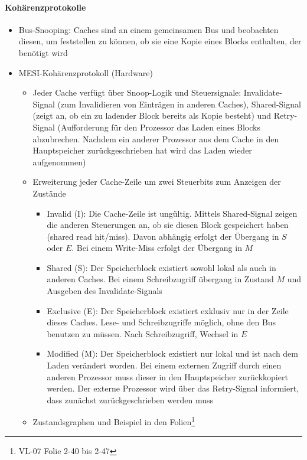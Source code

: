 	\paragraph{Kohärenzprotokolle}
		\begin{itemize}
			\item Bus-Snooping: Caches sind an einem gemeinsamen Bus und beobachten diesen, um feststellen zu können, ob sie eine Kopie eines Blocks enthalten, der benötigt wird
			\item MESI-Kohärenzprotokoll (Hardware)
			\begin{itemize}
				\item Jeder Cache verfügt über Snoop-Logik und Steuersignale: Invalidate-Signal (zum Invalidieren von Einträgen in anderen Caches), Shared-Signal (zeigt an, ob ein zu ladender Block bereits als Kopie besteht) und Retry-Signal (Aufforderung für den Prozessor das Laden eines Blocks abzubrechen. Nachdem ein anderer Prozessor aus dem Cache in den Hauptspeicher zurückgeschrieben hat wird das Laden wieder aufgenommen)
				\item Erweiterung jeder Cache-Zeile um zwei Steuerbits zum Anzeigen der Zustände
				\begin{itemize}
					\item Invalid (I): Die Cache-Zeile ist ungültig. Mittels Shared-Signal zeigen die anderen Steuerungen an, ob sie diesen Block gespeichert haben (shared read hit/miss). Davon abhängig erfolgt der Übergang in \(S\) oder \(E\). Bei einem Write-Miss erfolgt der Übergang in \(M\)
					\item Shared (S): Der Speicherblock existiert sowohl lokal als auch in anderen Caches. Bei einem Schreibzugriff übergang in Zustand \(M\) und Ausgeben des Invalidate-Signals
					\item Exclusive (E): Der Speicherblock existiert exklusiv nur in der Zeile dieses Caches. Lese- und Schreibzugriffe möglich, ohne den Bus benutzen zu müssen. Nach Schreibzugriff, Wechsel in \(E\)
					\item Modified (M): Der Speicherblock existiert nur lokal und ist nach dem Laden verändert worden. Bei einem externen Zugriff durch einen anderen Prozessor muss dieser in den Hauptspeicher zurückkopiert werden. Der externe Prozessor wird über das Retry-Signal informiert, dass zunächst zurückgeschrieben werden muss
				\end{itemize}
				\item Zustandsgraphen und Beispiel in den Folien\footnote{VL-07 Folie 2-40 bis 2-47}
			\end{itemize}

\end{itemize}
